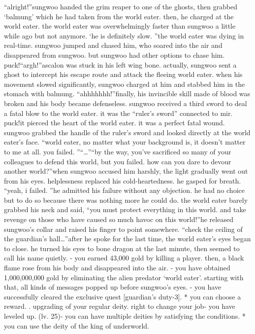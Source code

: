 “alright!”sungwoo handed the grim reaper to one of the ghosts, then grabbed ‘balmung’ which he had taken from the world eater.
 then, he charged at the world eater.
the world eater was overwhelmingly faster than sungwoo a little while ago but not anymore.
‘he is definitely slow.
”the world eater was dying in real-time.
 sungwoo jumped and chased him, who soared into the air and disappeared from sungwoo.
but sungwoo had other options to chase him.
puck!“argh!”ascalon was stuck in his left wing bone.
 actually, sungwoo sent a ghost to intercept his escape route and attack the fleeing world eater.
 when his movement slowed significantly, sungwoo charged at him and stabbed him in the stomach with balmung.
“ahhhhhhh!”finally, his invincible skill made of blood was broken and his body became defenseless.
sungwoo received a third sword to deal a fatal blow to the world eater.
 it was the “ruler’s sword” connected to mir.
puck!it pierced the heart of the world eater.
 it was a perfect fatal wound.
 sungwoo grabbed the handle of the ruler’s sword and looked directly at the world eater’s face.
“world eater, no matter what your background is, it doesn’t matter to me at all.
 you failed.
”“…”“by the way, you’ve sacrificed so many of your colleagues to defend this world, but you failed.
 how can you dare to devour another world?”when sungwoo accused him harshly, the light gradually went out from his eyes.
 helplessness replaced his cold-heartedness.
 he gasped for breath.
“yeah, i failed.
”he admitted his failure without any objection.
 he had no choice but to do so because there was nothing more he could do.
the world eater barely grabbed his neck and said, “you must protect everything in this world.
 and take revenge on those who have caused so much havoc on this world!”he released sungwoo’s collar and raised his finger to point somewhere.
“check the ceiling of the guardian’s hall…”after he spoke for the last time, the world eater’s eyes began to close.
he turned his eyes to bone dragon at the last minute, then seemed to call his name quietly.
- you earned 43,000 gold by killing a player.
then, a black flame rose from his body and disappeared into the air.
- you have obtained 1,000,000,000 gold by eliminating the alien predator ‘world eater’.
starting with that, all kinds of messages popped up before sungwoo’s eyes.
- you have successfully cleared the exclusive quest [guardian’s duty-3].
* you can choose a reward.
.
 upgrading of your regular deity.
 right to change your job- you have leveled up.
 (lv.
 25)- you can have multiple deities by satisfying the conditions.
* you can use the deity of the king of underworld.


